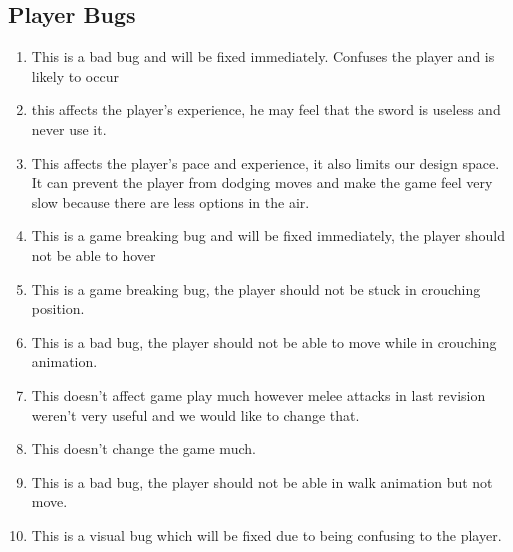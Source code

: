 \documentclass{article}
\begin{document}
\subsection*{Player Bugs}
\begin{enumerate}
	\item This is a bad bug and will be fixed immediately. Confuses the player and is likely to occur
	\item this affects the player's experience, he may feel that the sword is useless and never use it.
	\item This affects the player's pace and experience, it also limits our design space. It can prevent the player from dodging moves and make the game feel very slow because there are less options in the air.
	\item This is a game breaking bug and will be fixed immediately, the player should not be able to hover
	\item This is a game breaking bug, the player should not be stuck in crouching position. 
	\item This is a bad bug, the player should not be able to move while in crouching animation.
	\item This doesn't affect game play much however melee attacks in last revision weren't very useful and we would like to change that. 
	\item This doesn't change the game much.
	\item This is a bad bug, the player should not be able in walk animation but not move.
	\item This is a visual bug which will be fixed due to being confusing to the player.
\end{enumerate}
\end{document}

